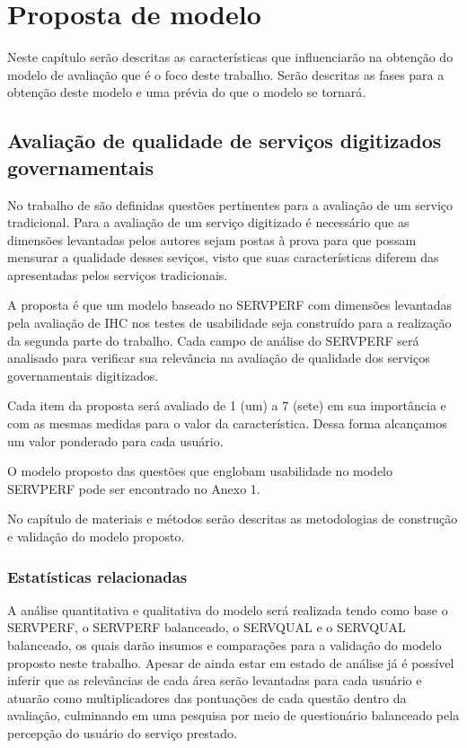 \chapter[Proposta de modelo]{Proposta de modelo}
Neste capítulo serão descritas as características que influenciarão na obtenção do modelo de avaliação que é o foco deste trabalho. Serão descritas as fases para a obtenção deste modelo e uma prévia do que o modelo se tornará.

\section{Avaliação de qualidade de serviços digitizados governamentais}
No trabalho de \cite{cronintaylor1992} são definidas questões pertinentes para a avaliação de um serviço tradicional. Para a avaliação de um serviço digitizado é necessário que as dimensões levantadas pelos autores sejam postas à prova para que possam mensurar a qualidade desses seviços, visto que suas características diferem das apresentadas pelos serviços tradicionais.

A proposta é que um modelo baseado no SERVPERF com dimensões levantadas pela avaliação de IHC nos testes de usabilidade seja construído para a realização da segunda parte do trabalho. Cada campo de análise do SERVPERF será analisado para verificar sua relevância na avaliação de qualidade dos serviços governamentais digitizados.

Cada item da proposta será avaliado de 1 (um) a 7 (sete) em sua importância e com as mesmas medidas para o valor da característica. Dessa forma alcançamos um valor ponderado para cada usuário.

O modelo proposto das questões que englobam usabilidade no modelo SERVPERF pode ser encontrado no Anexo 1.

No capítulo de materiais e métodos serão descritas as metodologias de construção e validação do modelo proposto.

\subsection{Estatísticas relacionadas}

A análise quantitativa e qualitativa do modelo será realizada tendo como base o SERVPERF, o SERVPERF balanceado, o SERVQUAL e o SERVQUAL balanceado, os quais darão insumos e comparações para a validação do modelo proposto neste trabalho. Apesar de ainda estar em estado de análise já é possível inferir que as relevâncias de cada área serão levantadas para cada usuário e atuarão como multiplicadores das pontuações de cada questão dentro da avaliação, culminando em uma pesquisa por meio de questionário balanceado pela percepção do usuário do serviço prestado.